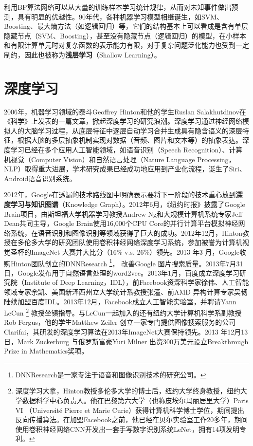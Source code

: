 利用BP算法网络可以从大量的训练样本学习统计规律，从而对未知事件做出预测，具有明显的优越性。90年代，各种机器学习模型相继诞生，如SVM、Boosting、最大熵方法（如逻辑回归）等，它们的结构基本上可以看成是含有单层隐藏节点（SVM、Boosting），甚至没有隐藏节点（逻辑回归）的模型，在小样本和有限计算单元时对复杂函数的表示能力有限，对于复杂问题泛化能力也受到一定制约，因此也被称为\textbf{浅层学习}（Shallow Learning）。

\section{深度学习}
2006年，机器学习领域的泰斗Geoffrey Hinton和他的学生Ruslan Salakhutdinov在《科学》上发表的一篇文章\cite{hinton2006reducing}，掀起深度学习的研究浪潮。深度学习通过神经网络模拟人的大脑学习过程，从底层特征中逐层自动学习合并生成具有隐含语义的深层特征，根据大脑的多层抽象机制实现对数据（音频、图片和文本等）的抽象表达。深度学习已经在多个应用人工智能领域，如语音识别（Speech Recognition）、计算机视觉（Computer Vision）和自然语言处理（Nature Language Processing，NLP）取得重大进展，学术研究成果已经成功地应用到产业化流程，诞生了Siri、Android语音识别系统。

2012年，Google在透漏的技术路线图中明确表示要将下一阶段的技术重心放到\textbf{深度学习与知识图谱}（Knowledge Graph）。2012年6月，《纽约时报》披露了Google Brain项目，由斯坦福大学机器学习教授Andrew Ng和大规模计算机系统专家Jeff Dean共同主导，Google Brain使用16,000个CPU Core的并行计算平台模拟神经网络系统，在语音识别和图像识别等领域获得了巨大的成功。2012年12月，Hinton教授在多伦多大学的研究团队使用卷积神经网络深度学习系统，参加被誉为计算机视觉圣杯的ImageNet 大赛并大比分（16\% v.s. 26\%）领先。2013 年3 月，Google收购Hinton团队创立的DNNResearch
\footnote{DNNResearch是一家专注于语音和图像识别技术的研究公司。}，
改善Google 图片搜索质量。2013年7月31日，Google发布用于自然语言处理的word2vec。2013年1月，百度成立深度学习研究院（Institute of Deep Learning，IDL），前Facebook资深科学家徐伟、人工智能领域专家余凯、美国新泽西州立大学统计系教授张潼、前AMD 异构计算专家吴韧陆续加盟百度IDL。2013年12月，Facebook成立人工智能实验室，并聘请Yann LeCun
\footnote{深度学习大拿，Hinton教授多伦多大学的博士后，纽约大学终身教授，纽约大学数据科学中心负责人。他在巴黎第六大学（也称皮埃尔玛丽居里大学）Paris VI （Universit\'{e} Pierre et Marie Curie）获得计算机科学博士学位，期间提出反向传播算法。在加盟Facebook之前，他已经在贝尔实验室工作20多年，期间使用卷积神经网络CNN开发出一套手写数字识别系统LeNet，拥有14项发明专利。}
教授坐镇指导。与LeCun一起加入的还有纽约大学计算机科学系副教授Rob Fergus，他的学生Matthew Zeiler 创立一家专门提供图像搜索服务的公司Clarifai，其研发的深度学习算法在2013年ImageNet大赛保持领先。2013 年12月13日，Mark Zuckerburg 与俄罗斯富豪Yuri Milner 出资300万美元设立Breakthrough Prize in Mathematics奖项。

